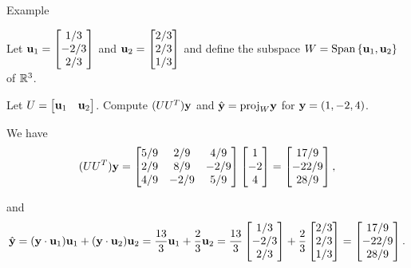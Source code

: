 \documentclass[xcolor=dvipsnames,aspectratio=169,t]{beamer}
\begin{document}
\begin{frame}{Example}
  \smallskip

  Let $\mathbf{u}_1 = \begin{bmatrix} 1/3 \\ -2/3 \\ 2/3 \end{bmatrix}$ and $\mathbf{u}_2 = \begin{bmatrix} 2/3 \\ 2/3 \\ 1/3 \end{bmatrix}$ and define the subspace $W = \mbox{Span} \left\{ \mathbf{u}_1 , \mathbf{u}_2 \right\}$  of $\mathbb{R}^3$.
  \smallskip
  
  Let $U = \begin{bmatrix} \mathbf{u}_1 & \mathbf{u}_2  \end{bmatrix}$.
  \alert{Compute} $(UU^T)\mathbf{y}$ and $\hat{\mathbf{y}}=\mbox{\mbox{proj}}_W \mathbf{y}$ for $\mathbf{y}=(1,-2,4)$.
  \bigskip

  \pause
  We have
  \[ (UU^T) \mathbf{y} = \begin{bmatrix} 5/9 & 2/9 & 4/9 \\ 2/9 & 8/9 & -2/9 \\ 4/9 & -2/9 & 5/9 \end{bmatrix}  \begin{bmatrix} 1 \\ -2 \\ 4 \end{bmatrix} = \begin{bmatrix} 17/9 \\ -22/9 \\ 28/9 \end{bmatrix}, \]

  \pause
  and
  \[ \hat{\mathbf{y}} = (\mathbf{y} \cdot \mathbf{u}_1) \mathbf{u}_1 + (\mathbf{y} \cdot \mathbf{u}_2) \mathbf{u}_2 = \frac{13}{3} \mathbf{u}_1 + \frac{2}{3} \mathbf{u}_2 = \frac{13}{3}  \begin{bmatrix} 1/3 \\ -2/3 \\ 2/3 \end{bmatrix} + \frac{2}{3} \begin{bmatrix} 2/3 \\ 2/3 \\ 1/3 \end{bmatrix} = \begin{bmatrix} 17/9 \\ -22/9 \\ 28/9 \end{bmatrix}. \]
\end{frame}
\end{document}
